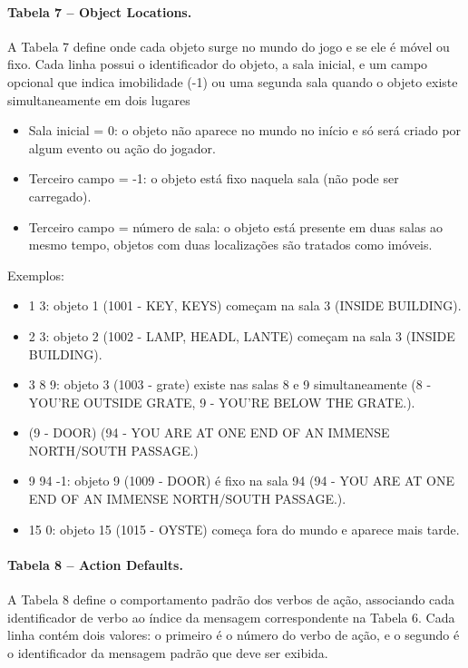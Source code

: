 \documentclass[12pt,a4paper]{article}
\begin{document}
\paragraph{Tabela 7 – Object Locations.}
A Tabela 7 define onde cada objeto surge no mundo do jogo e se ele é móvel ou fixo. Cada linha possui o identificador do objeto, a sala inicial, e um campo opcional que indica imobilidade (-1) ou uma segunda sala quando o objeto existe simultaneamente em dois lugares 

\begin{itemize}
  \item Sala inicial = 0: o objeto não aparece no mundo no início e só será criado por algum evento ou ação do jogador.
  \item Terceiro campo = -1: o objeto está fixo naquela sala (não pode ser carregado).
  \item Terceiro campo = número de sala: o objeto está presente em duas salas ao mesmo tempo, objetos com duas localizações são tratados como imóveis.
\end{itemize}

Exemplos:
\begin{itemize}
  \item 1 3: objeto 1 (1001 - KEY, KEYS) começam na sala 3 (INSIDE BUILDING).
  \item 2 3: objeto 2 (1002 - LAMP, HEADL, LANTE) começam na sala 3 (INSIDE BUILDING).
  \item 3 8 9: objeto 3 (1003 - grate) existe nas salas 8 e 9 simultaneamente (8 - YOU'RE OUTSIDE GRATE, 9 - YOU'RE BELOW THE GRATE.).
  \item (9 - DOOR) (94 - YOU ARE AT ONE END OF AN IMMENSE NORTH/SOUTH PASSAGE.)
  \item 9 94 -1: objeto 9 (1009 - DOOR) é fixo na sala 94 (94 - YOU ARE AT ONE END OF AN IMMENSE NORTH/SOUTH PASSAGE.).
  \item 15 0: objeto 15 (1015 - OYSTE) começa fora do mundo e aparece mais tarde.
\end{itemize}

\paragraph{Tabela 8 – Action Defaults.}  
A Tabela 8 define o comportamento padrão dos verbos de ação, associando cada identificador de verbo ao índice da mensagem correspondente na Tabela 6. Cada linha contém dois valores: o primeiro é o número do verbo de ação, e o segundo é o identificador da mensagem padrão que deve ser exibida.
\end{document}
